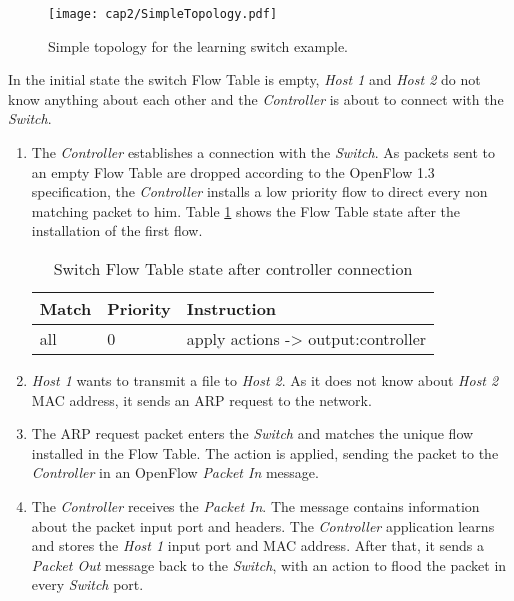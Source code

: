 \begin{figure}[H]
\centering
\texttt{[image: cap2/SimpleTopology.pdf]}
\caption{Simple topology for the learning switch example.}
\label{fig:simpletopo}
\end{figure}

In the initial state the switch Flow Table is empty, \textit{Host 1} and \textit{Host 2} do not know anything about each other and the  \textit{Controller} is about to connect with the \textit{Switch}. 

\begin{enumerate}

\item The \textit{Controller} establishes a connection with the \textit{Switch}. As packets sent to an empty Flow Table are dropped according to the OpenFlow 1.3 specification, the  \textit{Controller} installs a low priority flow to direct every non matching packet to him. Table \ref{tab:initialtable} shows the Flow Table state after the installation of the first flow.  

\begin{table}[H]
\centering
\caption{Switch Flow Table state after controller connection}
\label{tab:initialtable}
\begin{tabular}{|l|l|l|}
\hline
\textbf{Match}  & \textbf{Priority} & \textbf{Instruction}                              \\ \hline
all             & 0                 & apply actions -> output:controller                \\ \hline
\end{tabular}
\end{table}

\item \textit{Host 1} wants to transmit a file to \textit{Host 2}. As it does not know about \textit{Host 2} MAC address, it sends an ARP \cite{rfc826} request to the network.

\item The ARP request packet enters the \textit{Switch} and matches the unique flow installed in the Flow Table. The action is applied, sending the packet to the  \textit{Controller} in an OpenFlow \textit{Packet In} message.

\item The  \textit{Controller} receives the \textit{Packet In}. The message contains information about the packet input port and headers. The  \textit{Controller} application learns and stores the \textit{Host 1} input port and MAC address. After that, it sends a \textit{Packet Out} message back to the \textit{Switch}, with an action to flood the packet in every \textit{Switch} port.   


\end{enumerate}
